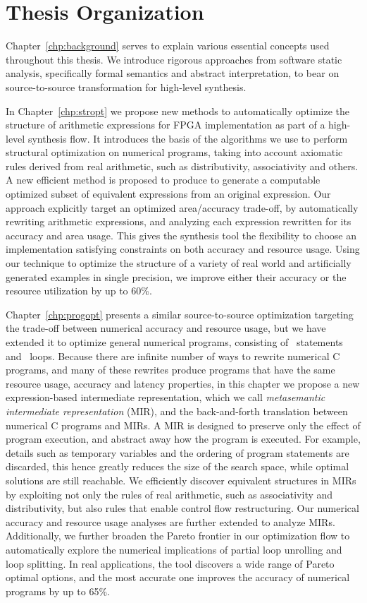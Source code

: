 \section{Thesis Organization}

Chapter~\ref{chp:background} serves to explain various essential concepts used
throughout this thesis.  We introduce rigorous approaches from software static
analysis, specifically formal semantics and abstract interpretation, to bear on
source-to-source transformation for high-level synthesis. 

In Chapter~\ref{chp:stropt} we propose new methods to automatically optimize
the structure of arithmetic expressions for FPGA implementation as part of
a high-level synthesis flow.  It introduces the basis of the algorithms we
use to perform structural optimization on numerical programs, taking into
account axiomatic rules derived from real arithmetic, such as distributivity,
associativity and others.  A new efficient method is proposed to produce to
generate a computable optimized subset of equivalent expressions from an
original expression.  Our approach explicitly target an optimized area/accuracy
trade-off, by automatically rewriting arithmetic expressions, and analyzing
each expression rewritten for its accuracy and area usage.  This gives
the synthesis tool the flexibility to choose an implementation satisfying
constraints on both accuracy and resource usage.  Using our technique to
optimize the structure of a variety of real world and artificially generated
examples in single precision, we improve either their accuracy or the resource
utilization by up to 60\%.

Chapter~\ref{chp:progopt} presents a similar source-to-source optimization
targeting the trade-off between numerical accuracy and resource usage, but
we have extended it to optimize general numerical programs, consisting of
\iflit~statements and \whilelit~loops.  Because there are infinite number
of ways to rewrite numerical C programs, and many of these rewrites produce
programs that have the same resource usage, accuracy and latency properties,
in this chapter we propose a new expression-based intermediate representation,
which we call \emph{metasemantic intermediate representation} (MIR), and the
back-and-forth translation between numerical C programs and MIRs.  A MIR
is designed to preserve only the effect of program execution, and abstract
away how the program is executed.  For example, details such as temporary
variables and the ordering of program statements are discarded, this hence
greatly reduces the size of the search space, while optimal solutions are
still reachable.  We efficiently discover equivalent structures in MIRs by
exploiting not only the rules of real arithmetic, such as associativity and
distributivity, but also rules that enable control flow restructuring.  Our
numerical accuracy and resource usage analyses are further extended to analyze
MIRs.  Additionally, we further broaden the Pareto frontier in our optimization
flow to automatically explore the numerical implications of partial loop
unrolling and loop splitting.  In real applications, the tool discovers a
wide range of Pareto optimal options, and the most accurate one improves the
accuracy of numerical programs by up to 65\%.


